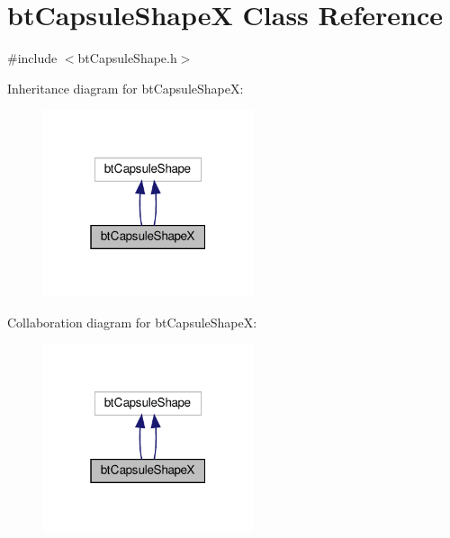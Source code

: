 \hypertarget{classbtCapsuleShapeX}{}\section{bt\+Capsule\+ShapeX Class Reference}
\label{classbtCapsuleShapeX}


{\ttfamily \#include $<$bt\+Capsule\+Shape.\+h$>$}



Inheritance diagram for bt\+Capsule\+ShapeX\+:
\nopagebreak
\begin{figure}[H]
\begin{center}
\leavevmode
\includegraphics[width=175pt]{classbtCapsuleShapeX__inherit__graph}
\end{center}
\end{figure}


Collaboration diagram for bt\+Capsule\+ShapeX\+:
\nopagebreak
\begin{figure}[H]
\begin{center}
\leavevmode
\includegraphics[width=175pt]{classbtCapsuleShapeX__coll__graph}
\end{center}
\end{figure}

